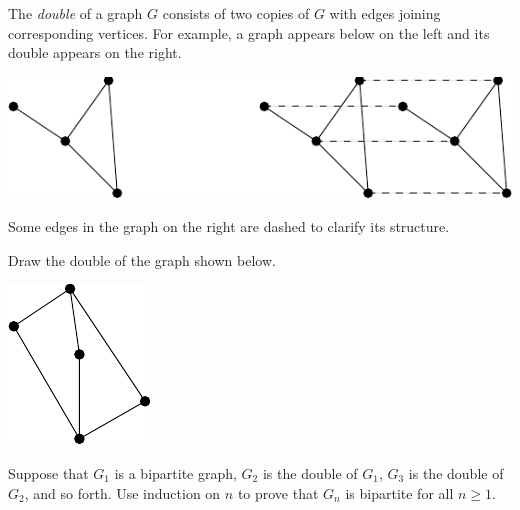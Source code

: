 \documentclass[12pt,oneside]{article}
\begin{document}
\begin{problem}[15 points]
The \textit{double} of a graph $G$ consists of two copies of $G$ with
edges joining corresponding vertices.  For example, a graph appears
below on the left and its double appears on the right.
%
\begin{center}
\includegraphics{double}
\end{center}
%
Some edges in the graph on the right are dashed to clarify its
structure.

\bparts

\ppart Draw the double of the graph shown below.

\vspace{0.2in}

\noindent \includegraphics{youdouble}

\vspace{0.2in}

\newpage

\ppart Suppose that $G_1$ is a bipartite graph, $G_2$ is the double of
$G_1$, $G_3$ is the double of $G_2$, and so forth.  Use induction on
$n$ to prove that $G_n$ is bipartite for all $n \geq 1$.


\end{problem}
\end{document}
